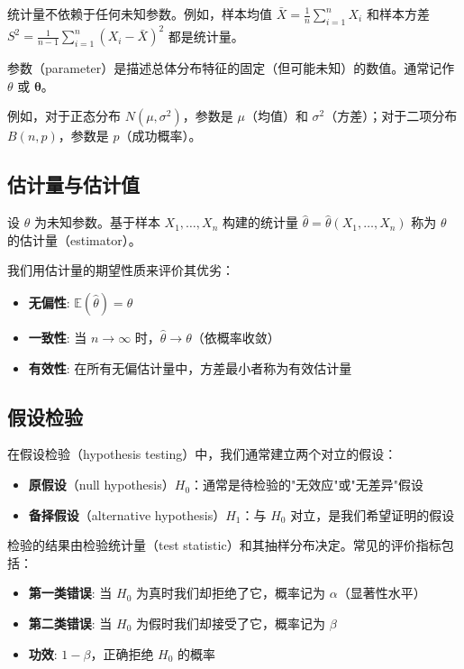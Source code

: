 统计量不依赖于任何未知参数。例如，样本均值 $\bar{X} = \frac{1}{n} \sum_{i=1}^n X_i$ 和样本方差 $S^2 = \frac{1}{n-1} \sum_{i=1}^n (X_i - \bar{X})^2$ 都是统计量。

\begin{Definition}[参数]
参数（parameter）是描述总体分布特征的固定（但可能未知）的数值。通常记作 $\theta$ 或 $\boldsymbol{\theta}$。
\end{Definition}

例如，对于正态分布 $N(\mu, \sigma^2)$，参数是 $\mu$（均值）和 $\sigma^2$（方差）；对于二项分布 $B(n, p)$，参数是 $p$（成功概率）。

\subsection{估计量与估计值}

\begin{Definition}[估计量]
设 $\theta$ 为未知参数。基于样本 $X_1, \ldots, X_n$ 构建的统计量 $\hat{\theta} = \hat{\theta}(X_1, \ldots, X_n)$ 称为 $\theta$ 的估计量（estimator）。
\end{Definition}

我们用估计量的期望性质来评价其优劣：
\begin{itemize}
    \item \textbf{无偏性}: $\mathbb{E}(\hat{\theta}) = \theta$
    \item \textbf{一致性}: 当 $n \to \infty$ 时，$\hat{\theta} \to \theta$（依概率收敛）
    \item \textbf{有效性}: 在所有无偏估计量中，方差最小者称为有效估计量
\end{itemize}

\subsection{假设检验}

\begin{Definition}[原假设与备择假设]
在假设检验（hypothesis testing）中，我们通常建立两个对立的假设：
\begin{itemize}
    \item \textbf{原假设}（null hypothesis）$H_0$：通常是待检验的"无效应"或"无差异"假设
    \item \textbf{备择假设}（alternative hypothesis）$H_1$：与 $H_0$ 对立，是我们希望证明的假设
\end{itemize}
\end{Definition}

检验的结果由检验统计量（test statistic）和其抽样分布决定。常见的评价指标包括：
\begin{itemize}
    \item \textbf{第一类错误}: 当 $H_0$ 为真时我们却拒绝了它，概率记为 $\alpha$（显著性水平）
    \item \textbf{第二类错误}: 当 $H_0$ 为假时我们却接受了它，概率记为 $\beta$
    \item \textbf{功效}: $1 - \beta$，正确拒绝 $H_0$ 的概率
\end{itemize}

